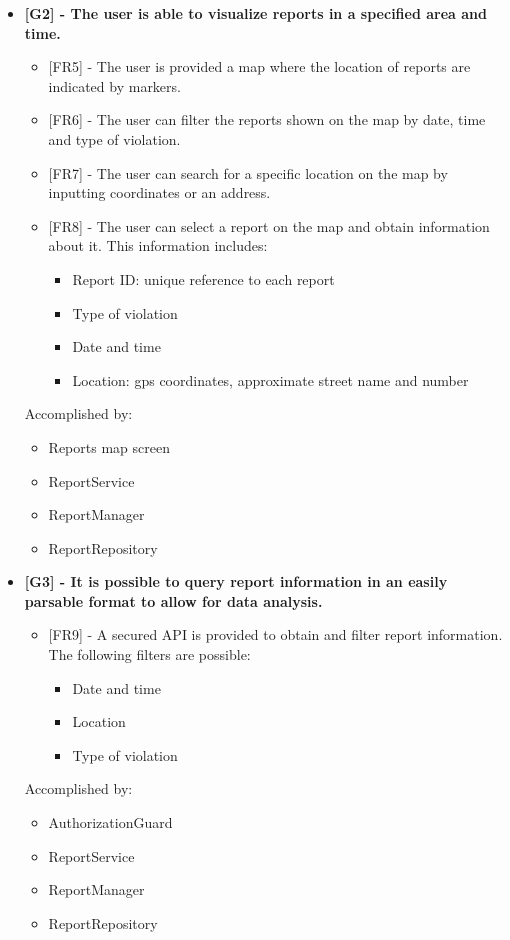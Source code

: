 \begin{itemize}[label={}]
    \item \textbf{[G2] - The user is able to visualize reports in a specified area and time.}
        \begin{itemize}[label={}]
            \item {[FR5]} - The user is provided a map where the location of reports are indicated by markers.
            \item {[FR6]} - The user can filter the reports shown on the map by date, time and type of violation.
            \item {[FR7]} - The user can search for a specific location on the map by inputting coordinates or an address.
            \item {[FR8]} - The user can select a report on the map and obtain information about it. This information includes:
            \begin{itemize}[label={\textbullet}]
                \item Report ID: unique reference to each report
                \item Type of violation
                \item Date and time
                \item Location: gps coordinates, approximate street name and number
            \end{itemize}
        \end{itemize}
        Accomplished by:
        \begin{itemize}[label={\textbullet}]
            \item Reports map screen
            \item ReportService
            \item ReportManager
            \item ReportRepository
        \end{itemize}

    \item \textbf{[G3] - It is possible to query report information in an easily parsable format to allow for data analysis.}
        \begin{itemize}[label={}]
            \item {[FR9]} - A secured API is provided to obtain and filter report information. The following filters are possible:
            \begin{itemize}[label={\textbullet}]
                \item Date and time
                \item Location
                \item Type of violation
            \end{itemize}
        \end{itemize}
        Accomplished by:
        \begin{itemize}[label={\textbullet}]
            \item AuthorizationGuard
            \item ReportService
            \item ReportManager
            \item ReportRepository
        \end{itemize}


\end{itemize}
